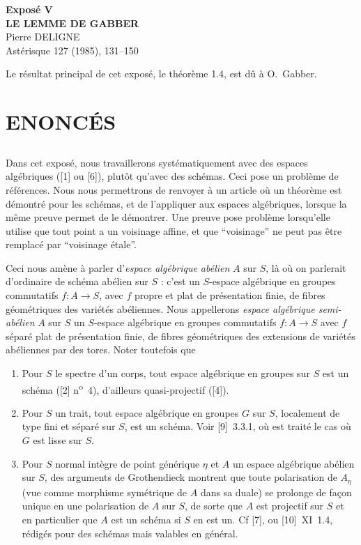 \documentclass[12pt,a4paper]{article}
\theoremstyle{plain}
\theoremstyle{definition}
\theoremstyle{remark}
\begin{document}
\begin{center}
{\Large\bf Exposé V}\\[0.5em]
{\LARGE\bf LE LEMME DE GABBER}\\[1em]
{\large Pierre DELIGNE}\\[1em]
{\small Astérisque 127 (1985), 131--150}
\end{center}

\vspace{1em}

\begin{center}
Le résultat principal de cet exposé, le théorème 1.4, est dû à O.~Gabber.
\end{center}

\section{ENONCÉS}

\subsection{} Dans cet exposé, nous travaillerons systématiquement avec des espaces algébriques ([1] ou [6]), plutôt qu'avec des schémas. Ceci pose un problème de références. Nous nous permettrons de renvoyer à un article où un théorème est démontré pour les schémas, et de l'appliquer aux espaces algébriques, lorsque la même preuve permet de le démontrer. Une preuve pose problème lorsqu'elle utilise que tout point a un voisinage affine, et que ``voisinage'' ne peut pas être remplacé par ``voisinage étale''.

Ceci nous amène à parler d'\emph{espace algébrique abélien} $A$ sur $S$, là où on parlerait d'ordinaire de schéma abélien sur $S$ : c'est un $S$-espace algébrique en groupes commutatifs $f : A \to S$, avec $f$ propre et plat de présentation finie, de fibres géométriques des variétés abéliennes. Nous appellerons \emph{espace algébrique semi-abélien} $A$ sur $S$ un $S$-espace algébrique en groupes commutatifs $f : A \to S$ avec $f$ séparé plat de présentation finie, de fibres géométriques des extensions de variétés abéliennes par des tores. Noter toutefois que

\begin{enumerate}[label=(\alph*)]
\item Pour $S$ le spectre d'un corps, tout espace algébrique en groupes sur $S$ est un schéma ([2] n\textsuperscript{o}~4), d'ailleurs quasi-projectif ([4]).
\item Pour $S$ un trait, tout espace algébrique en groupes $G$ sur $S$, localement de type fini et séparé sur $S$, est un schéma. Voir [9]~3.3.1, où est traité le cas où $G$ est lisse sur $S$.
\item Pour $S$ normal intègre de point générique $\eta$ et $A$ un espace algébrique abélien sur $S$, des arguments de Grothendieck montrent que toute polarisation de $A_\eta$ (vue comme morphisme symétrique de $A$ dans sa duale) se prolonge de façon unique en une polarisation de $A$ sur $S$, de sorte que $A$ est projectif sur $S$ et en particulier que $A$ est un schéma si $S$ en est un. Cf [7], ou [10]~XI~1.4, rédigés pour des schémas mais valables en général.
\end{enumerate}
\end{document}
